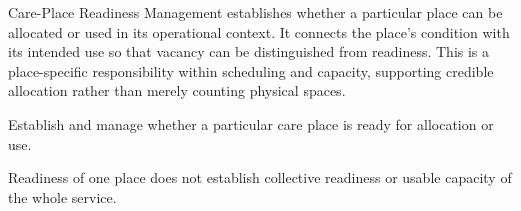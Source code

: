 Care-Place Readiness Management establishes whether a particular place can be allocated or used in its operational context. It connects the place's condition with its intended use so that vacancy can be distinguished from readiness. This is a place-specific responsibility within scheduling and capacity, supporting credible allocation rather than merely counting physical spaces.



Establish and manage whether a particular care place is ready for allocation or use.



Readiness of one place does not establish collective readiness or usable capacity of the whole service.


